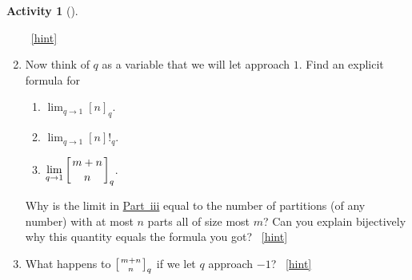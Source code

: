 \documentclass[10pt,]{book}
\theoremstyle{plain}
\theoremstyle{definition}
\theoremstyle{definition}
\theoremstyle{definition}
\newtheorem{activity}[project]{Activity}
\numberwithin{equation}{chapter}
\newcommand{\qchoose}[2]{\left[{#1\atop#2}\right]_q}
\begin{document}
\begin{activity}[]
\begin{enumerate}[font=\bfseries,label=(\alph*),ref=\alph*]
\begin{equation*}
\end{equation*}
%
~\hfill{\tiny\hyperlink{a-265.f}{[hint]}\hypertarget{q-265.f}{}}\item\label{task-219} \hypertarget{p-1234}{}%
Now think of \(q\) as a variable that we will let approach \(1\). Find an explicit formula for \leavevmode%
\begin{enumerate}[label=(\roman*)]
\item\hypertarget{li-34}{}\(\displaystyle\lim_{q\rightarrow 1} [n]_q\).%
\item\hypertarget{li-35}{}\(\displaystyle\lim_{q\rightarrow 1} [n]!_q\).%
\item\hypertarget{q-binomial-lim}{}\(\displaystyle\lim_{q\rightarrow 1} \qchoose{m+n}{n}\).%
\end{enumerate}
 Why is the limit in \hyperlink{q-binomial-lim}{Part~iii} equal to the number of partitions (of any number) with at most \(n\) parts all of size most \(m\)? Can you explain bijectively why this quantity equals the formula you got?%
~\hfill{\tiny\hyperlink{a-265.g}{[hint]}\hypertarget{q-265.g}{}}\item\label{task-220} \hypertarget{p-1237}{}%
What happens to \(\qchoose{m+n}{n}\) if we let \(q\) approach \(-1\)?%
~\hfill{\tiny\hyperlink{a-265.h}{[hint]}\hypertarget{q-265.h}{}}\end{enumerate}
\end{activity}
\typeout{************************************************}
\typeout{************************************************}
\end{document}

